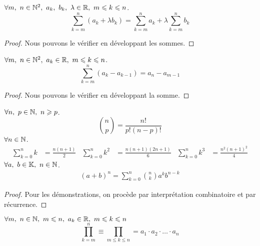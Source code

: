 \begin{proposition}
    $\forall m,\ n \in \N^2,\ a_k,\ b_k,\ \lambda \in \R,\ m \leq k \leq n$.
    \[ \sum_{k = m}^{n} (a_k + \lambda b_k) = \sum_{k = m}^n a_k + \lambda \sum_{k = m}^n b_k \]
\end{proposition}

\begin{proof}
	Nous pouvons le vérifier en développant les sommes.
\end{proof}

\begin{proposition}
    $\forall m,\ n \in \mathbb{N}^2,\ a_k \in \mathbb{R},\ m \leqslant k \leqslant n$.
    \[ \sum_{k = m}^n (a_k - a_{k - 1}) = a_n - a_{m - 1} \]
\end{proposition}

\begin{proof}
	Nous pouvons le vérifier en développant la somme.
\end{proof}

\begin{proposition}
	$\forall n,\ p \in \mathbb{N},\ n \geqslant p$.
	\[ \binom{n}{p} = \frac{n!}{p!(n - p)!} \]
	$\forall n \in \mathbb{N}$.
	\begin{align*}
		\sum_{k = 0}^{n} k &= \frac{n(n+1)}{2} & 
		\sum_{k = 0}^{n} k^2 &= \frac{n(n+1)(2n+1)}{6} &
		\sum_{k = 0}^{n} k^3 &= \frac{n^2(n+1)^2}{4}
	\end{align*}
	$\forall a,\ b \in \mathbb{K},\ n \in \mathbb{N}$.
	\begin{align*}
		(a + b)^n = \sum_{k = 0}^{n} \binom{n}{k} a^kb^{n-k}
	\end{align*}
\end{proposition}
\begin{proof}
    Pour les démonstrations, on procède par interprétation combinatoire et par récurrence.
\end{proof}

\begin{definition}[Produit]
    $\forall m,\ n \in \mathbb{N},\ m \leqslant n,\ a_k \in \mathbb{R},\ m \leqslant k \leqslant n$
    \[ \prod_{k = m}^{n} \equiv \prod_{m \leq k \leq n} = a_1 \cdot a_2 \cdot \ldots \cdot a_n \]
\end{definition}